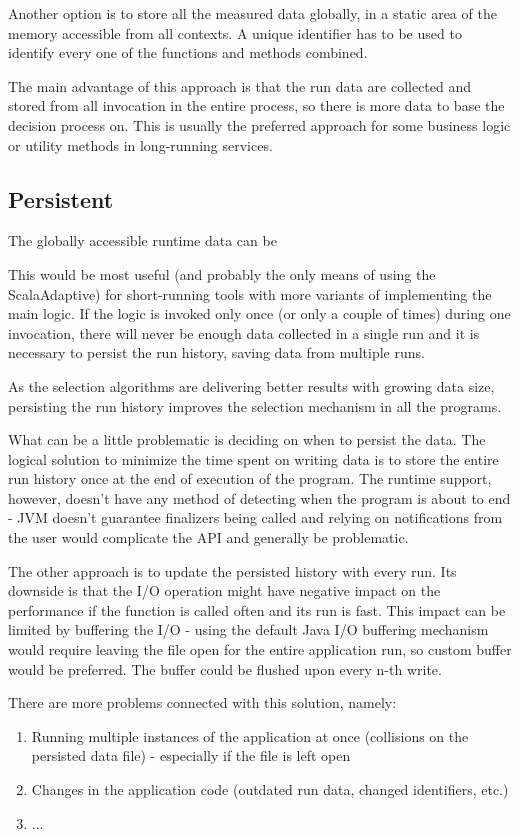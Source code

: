 Another option is to store all the measured data globally, in a static area of the memory accessible from all contexts. A unique identifier has to be used to identify every one of the functions and methods combined.

The main advantage of this approach is that the run data are collected and stored from all invocation in the entire process, so there is more data to base the decision process on. This is usually the preferred approach for some business logic or utility methods in long-running services.

\subsection{Persistent}

The globally accessible runtime data can be 

This would be most useful (and probably the only means of using the ScalaAdaptive) for short-running tools with more variants of implementing the main logic. If the logic is invoked only once (or only a couple of times) during one invocation, there will never be enough data collected in a single run and it is necessary to persist the run history, saving data from multiple runs.

As the selection algorithms are delivering better results with growing data size, persisting the run history improves the selection mechanism in all the programs.

What can be a little problematic is deciding on when to persist the data. The logical solution to minimize the time spent on writing data is to store the entire run history once at the end of execution of the program. The runtime support, however, doesn't have any method of detecting when the program is about to end - JVM doesn't guarantee finalizers being called and relying on notifications from the user would complicate the API and generally be problematic.

The other approach is to update the persisted history with every run. Its downside is that the I/O operation might have negative impact on the performance if the function is called often and its run is fast. This impact can be limited by buffering the I/O - using the default Java I/O buffering mechanism would require leaving the file open for the entire application run, so custom buffer would be preferred. The buffer could be flushed upon every n-th write.

There are more problems connected with this solution, namely:
\begin{enumerate}
\item Running multiple instances of the application at once (collisions on the persisted data file) - especially if the file is left open
\item Changes in the application code (outdated run data, changed identifiers, etc.)
\item ...
\end{enumerate}

